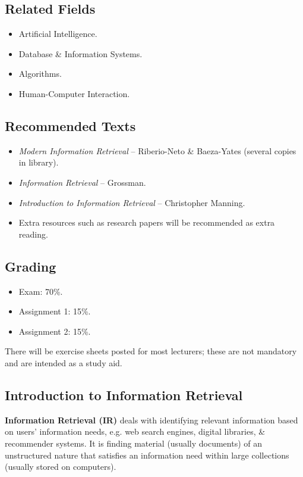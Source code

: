 \documentclass[a4paper,11pt]{article}
\begin{document}
\subsection{Related Fields}
\begin{itemize}
    \item   Artificial Intelligence.
    \item   Database \& Information Systems.
    \item   Algorithms.
    \item   Human-Computer Interaction.
\end{itemize}

\subsection{Recommended Texts}
\begin{itemize}
    \item   \textit{Modern Information Retrieval} -- Riberio-Neto \& Baeza-Yates (several copies in library).
    \item   \textit{Information Retrieval} -- Grossman.
    \item   \textit{Introduction to Information Retrieval} -- Christopher Manning.
    \item   Extra resources such as research papers will be recommended as extra reading.
\end{itemize}

\subsection{Grading}
\begin{itemize}
    \item   Exam: 70\%.
    \item   Assignment 1: 15\%.
    \item   Assignment 2: 15\%.
\end{itemize}

There will be exercise sheets posted for most lecturers; these are not mandatory and are intended as a study aid.

\subsection{Introduction to Information Retrieval}
\textbf{Information Retrieval (IR)} deals with identifying relevant information based on users' information needs, e.g.
web search engines, digital libraries, \& recommender systems. 
It is finding material (usually documents) of an unstructured nature that satisfies an information need within large
collections (usually stored on computers).
\end{document}
